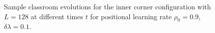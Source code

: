 \begin{figure}[htbp!]
    \label{fig:2DBPCAIH sample class evolution high rho}
    \caption{Sample classroom evolutions for the inner corner configuration with $L=128$ at different times $t$ for positional learning rate $\rho_0=0.9$, $\delta\lambda = 0.1$.}
 \end{figure}

